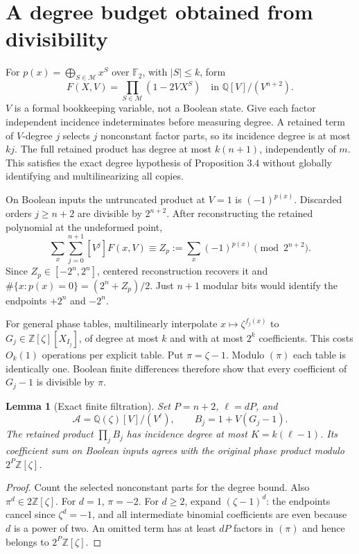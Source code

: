 \documentclass[11pt,a4paper]{article}
\newtheorem{lemma}[theorem]{Lemma}
\theoremstyle{remark}\newtheorem{remark}[theorem]{Remark}
\newcommand{\F}{\mathbb F}\newcommand{\Q}{\mathbb Q}\newcommand{\Z}{\mathbb Z}
\begin{document}
\section{A degree budget obtained from divisibility}
For $p(x)=\bigoplus_{S\in\mathcal M}x^S$ over $\F_2$, with $|S|\le k$,
form
\begin{equation}\label{eq:binaryproduct}
 F(X,V)=\prod_{S\in\mathcal M}(1-2VX^S)
       \quad\text{in }\Q[V]/(V^{n+2}).
\end{equation}
$V$ is a formal bookkeeping variable, not a Boolean state. Give each
factor independent incidence indeterminates before measuring degree.
A retained term of $V$-degree $j$ selects $j$ nonconstant factor parts,
so its incidence degree is at most $kj$. The full retained product has
degree at most $k(n+1)$, independently of $m$. This satisfies the exact
degree hypothesis of Proposition 3.4 without globally identifying and
multilinearizing all copies.

On Boolean inputs the untruncated product at $V=1$ is $(-1)^{p(x)}$.
Discarded orders $j\ge n+2$ are divisible by $2^{n+2}$. After reconstructing
the retained polynomial at the undeformed point,
\[
 \sum_x\sum_{j=0}^{n+1}[V^j]F(x,V)
 \equiv Z_p:=\sum_x(-1)^{p(x)}\pmod {2^{n+2}}.
\]
Since $Z_p\in[-2^n,2^n]$, centered reconstruction recovers it and
$\#\{x:p(x)=0\}=(2^n+Z_p)/2$. Just $n+1$ modular bits would identify
the endpoints $+2^n$ and $-2^n$.

For general phase tables, multilinearly interpolate
$x\mapsto\zeta^{f_j(x)}$ to $G_j\in\Z[\zeta][X_{I_j}]$, of degree
at most $k$ and with at most $2^k$ coefficients. This costs $O_k(1)$
operations per explicit table. Put $\pi=\zeta-1$. Modulo $(\pi)$ each
table is identically one. Boolean finite differences therefore show
that every coefficient of $G_j-1$ is divisible by $\pi$.

\begin{lemma}[Exact finite filtration]\label{lem:filtration}
Set $P=n+2$, $\ell=dP$, and
\[
 \mathcal A=\Q(\zeta)[V]/(V^\ell),\qquad B_j=1+V(G_j-1).
\]
The retained product $\prod_jB_j$ has incidence degree at most
$K=k(\ell-1)$. Its coefficient sum on Boolean inputs agrees with the
original phase product modulo $2^P\Z[\zeta]$.
\end{lemma}
\begin{proof}
Count the selected nonconstant parts for the degree bound.
Also $\pi^d\in2\Z[\zeta]$. For $d=1$, $\pi=-2$.
For $d\ge2$, expand $(\zeta-1)^d$: the endpoints cancel since
$\zeta^d=-1$, and all intermediate binomial coefficients are even
because $d$ is a power of two. An omitted term has at least $dP$
factors in $(\pi)$ and hence belongs to $2^P\Z[\zeta]$.
\end{proof}
\end{document}
